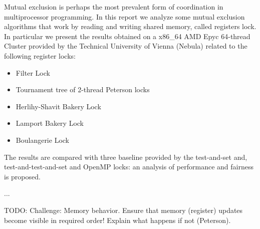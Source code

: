 Mutual exclusion is perhaps the most prevalent form of coordination in multiprocessor programming. In this report we analyze some mutual exclusion algorithms that work by reading and writing shared memory, called registers lock. In particular we present the results obtained on a x86\_64 AMD Epyc 64-thread Cluster provided by the Technical University of Vienna (Nebula) related to the following register locks:

\begin{itemize}
	\item Filter Lock
	\item Tournament tree of 2-thread Peterson locks
	\item Herlihy-Shavit Bakery Lock
	\item Lamport Bakery Lock
	\item Boulangerie Lock
\end{itemize}

The results are compared with three baseline provided by the test-and-set and, test-and-test-and-set and OpenMP locks: an analysis of performance and fairness is proposed.


...

TODO:
Challenge: Memory behavior. Ensure that memory (register)
updates become visible in required order! Explain what happens if
not (Peterson).
